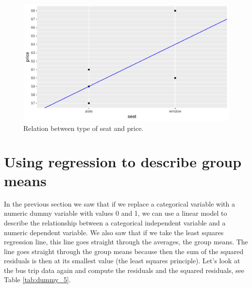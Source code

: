 \documentclass[]{report}\usepackage[]{graphicx}\usepackage[]{color}
\makeatletter
\def\maxwidth{ %
  \ifdim\Gin@nat@width>\linewidth
    \linewidth
  \else
    \Gin@nat@width
  \fi
}
\newenvironment{knitrout}{}{} %
\makeatother
\begin{document}
\begin{knitrout}
\color{fgcolor}\begin{figure}

{\centering \includegraphics[width=\maxwidth]{figure/dummy_4-1} 

}

\caption[Relation between type of seat and price]{Relation between type of seat and price.}\label{fig:dummy_4}
\end{figure}


\end{knitrout}



\section{Using regression to describe group means}

In the previous section we saw that if we replace a categorical variable with a numeric dummy variable with values 0 and 1, we can use a linear model to describe the relationship between a categorical independent variable and a numeric dependent variable. We also saw that if we take the least squares regression line, this line goes straight through the averages, the group means. The line goes straight through the group means because then the sum of the squared residuals is then at its smallest value (the least squares principle).  Let's look at the bus trip data again and compute the residuals and the squared residuals, see Table \ref{tab:dummy_5}.
\end{document}
